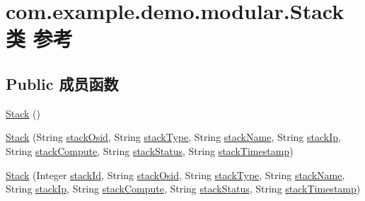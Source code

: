 \hypertarget{classcom_1_1example_1_1demo_1_1modular_1_1_stack}{}\section{com.\+example.\+demo.\+modular.\+Stack类 参考}
\label{classcom_1_1example_1_1demo_1_1modular_1_1_stack}
\subsection*{Public 成员函数}
\begin{DoxyCompactItemize}
\item 
\mbox{\hyperlink{classcom_1_1example_1_1demo_1_1modular_1_1_stack_ad0578df38c6f45de34f50fdeb005c26f}{Stack}} ()
\item 
\mbox{\hyperlink{classcom_1_1example_1_1demo_1_1modular_1_1_stack_a7fb082a235db61ee37b56a59b8640095}{Stack}} (String \mbox{\hyperlink{classcom_1_1example_1_1demo_1_1modular_1_1_stack_aa8fd54c63bd8fbeef9689ed0790a0a2a}{stack\+Osid}}, String \mbox{\hyperlink{classcom_1_1example_1_1demo_1_1modular_1_1_stack_a0c655d23ddd865937a884dabf0190f3e}{stack\+Type}}, String \mbox{\hyperlink{classcom_1_1example_1_1demo_1_1modular_1_1_stack_ae5759a731886729bcf087959692f1542}{stack\+Name}}, String \mbox{\hyperlink{classcom_1_1example_1_1demo_1_1modular_1_1_stack_ae0bbcc492595b5920765995bfe148e69}{stack\+Ip}}, String \mbox{\hyperlink{classcom_1_1example_1_1demo_1_1modular_1_1_stack_afaed809049fbbe917b1cd5ea2e12eb71}{stack\+Compute}}, String \mbox{\hyperlink{classcom_1_1example_1_1demo_1_1modular_1_1_stack_ab10e822c3d240e4132ea8cc69569c656}{stack\+Status}}, String \mbox{\hyperlink{classcom_1_1example_1_1demo_1_1modular_1_1_stack_a48dd28066eafe12d6adef0184251cd76}{stack\+Timestamp}})
\item 
\mbox{\hyperlink{classcom_1_1example_1_1demo_1_1modular_1_1_stack_a9bdfcb1487e4fd501d02bbf1df4be4ca}{Stack}} (Integer \mbox{\hyperlink{classcom_1_1example_1_1demo_1_1modular_1_1_stack_a39181f285b8fb046b291930dbd9b407b}{stack\+Id}}, String \mbox{\hyperlink{classcom_1_1example_1_1demo_1_1modular_1_1_stack_aa8fd54c63bd8fbeef9689ed0790a0a2a}{stack\+Osid}}, String \mbox{\hyperlink{classcom_1_1example_1_1demo_1_1modular_1_1_stack_a0c655d23ddd865937a884dabf0190f3e}{stack\+Type}}, String \mbox{\hyperlink{classcom_1_1example_1_1demo_1_1modular_1_1_stack_ae5759a731886729bcf087959692f1542}{stack\+Name}}, String \mbox{\hyperlink{classcom_1_1example_1_1demo_1_1modular_1_1_stack_ae0bbcc492595b5920765995bfe148e69}{stack\+Ip}}, String \mbox{\hyperlink{classcom_1_1example_1_1demo_1_1modular_1_1_stack_afaed809049fbbe917b1cd5ea2e12eb71}{stack\+Compute}}, String \mbox{\hyperlink{classcom_1_1example_1_1demo_1_1modular_1_1_stack_ab10e822c3d240e4132ea8cc69569c656}{stack\+Status}}, String \mbox{\hyperlink{classcom_1_1example_1_1demo_1_1modular_1_1_stack_a48dd28066eafe12d6adef0184251cd76}{stack\+Timestamp}})

\end{DoxyCompactItemize}
